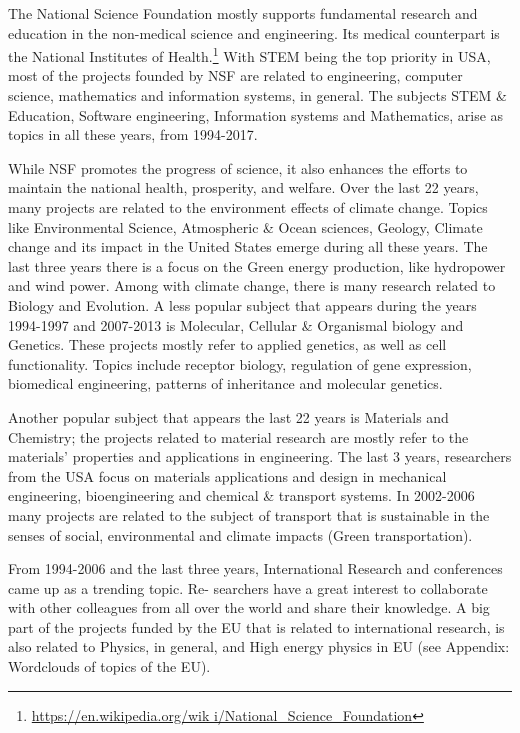\documentclass[12pt]{report}
\begin{document}
The National Science Foundation mostly supports fundamental research and
education in the non-medical science and engineering. Its medical counterpart
is the National Institutes of Health.\footnote{\url{https://en.wikipedia.org/wik
i/National_Science_Foundation}} With STEM being the top priority in USA, most of
the projects founded by NSF are related to engineering, computer science,
mathematics and information systems, in general. The subjects STEM \& Education,
Software engineering, Information systems and Mathematics, arise as topics in
all these years, from 1994-2017.

While NSF promotes the progress of science, it also enhances the efforts to
maintain the national health, prosperity, and welfare. Over the last 22 years,
many projects are related to the environment effects of climate change. Topics
like Environmental Science, Atmospheric \& Ocean sciences, Geology, Climate
change and its impact in the United States emerge during all these years. The
last three years there is a focus on the Green energy production, like
hydropower and wind power. Among with climate change, there is many research
related to Biology and Evolution. A less popular subject that appears during the
years 1994-1997 and 2007-2013 is Molecular, Cellular \& Organismal biology and
Genetics. These projects mostly refer to applied genetics, as well as cell
functionality. Topics include receptor biology, regulation of gene expression,
biomedical engineering, patterns of inheritance and molecular genetics.

Another popular subject that appears the last 22 years is Materials and
Chemistry; the projects related to material research are mostly refer to the
materials' properties and applications in engineering. The last 3 years,
researchers from the USA focus on materials applications and design in
mechanical engineering, bioengineering and chemical \& transport systems. In
2002-2006 many projects are related to the subject of transport that is
sustainable in the senses of social, environmental and climate impacts (Green
transportation).

From 1994-2006 and the last three years, International Research and conferences
came up as a trending topic. Re- searchers have a great interest to collaborate
with other colleagues from all over the world and share their knowledge. A big
part of the projects funded by the EU that is related to international research,
is also related to Physics, in general, and High energy physics in EU (see
Appendix: Wordclouds of topics of the EU).
\end{document}
